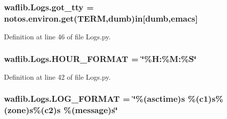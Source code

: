 \subsubsection[{\texorpdfstring{got\+\_\+tty}{got_tty}}]{ waflib.\+Logs.\+got\+\_\+tty = notos.\+environ.\+get(\textquotesingle{}T\+E\+RM\textquotesingle{},\textquotesingle{}dumb\textquotesingle{}){\bf in}\mbox{[}\textquotesingle{}dumb\textquotesingle{},\textquotesingle{}emacs\textquotesingle{}\mbox{]}}\hypertarget{namespacewaflib_1_1_logs_a9d8cb5660731b5f4b5075f87ac53e18b}{}\label{namespacewaflib_1_1_logs_a9d8cb5660731b5f4b5075f87ac53e18b}


Definition at line 46 of file Logs.\+py.

\subsubsection[{\texorpdfstring{H\+O\+U\+R\+\_\+\+F\+O\+R\+M\+AT}{HOUR_FORMAT}}]{ waflib.\+Logs.\+H\+O\+U\+R\+\_\+\+F\+O\+R\+M\+AT = \char`\"{}\%H\+:\%M\+:\%{\bf S}\char`\"{}}\hypertarget{namespacewaflib_1_1_logs_a056fc4f4d0312c670d1a48a6e7437e4f}{}\label{namespacewaflib_1_1_logs_a056fc4f4d0312c670d1a48a6e7437e4f}


Definition at line 42 of file Logs.\+py.

\subsubsection[{\texorpdfstring{L\+O\+G\+\_\+\+F\+O\+R\+M\+AT}{LOG_FORMAT}}]{ waflib.\+Logs.\+L\+O\+G\+\_\+\+F\+O\+R\+M\+AT = \char`\"{}\%(asctime){\bf s} \%(c1){\bf s}\%(zone){\bf s}\%({\bf c2}){\bf s} \%(message){\bf s}\char`\"{}}\hypertarget{namespacewaflib_1_1_logs_a58481ae94e5c27a87d83c8bd691f9263}{}\label{namespacewaflib_1_1_logs_a58481ae94e5c27a87d83c8bd691f9263}



